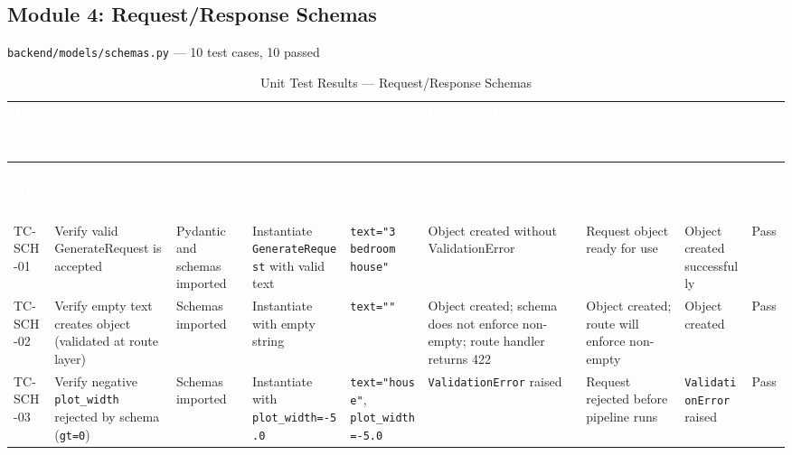 \subsection{Module 4: Request/Response Schemas}
\texttt{backend/models/schemas.py} — 10 test cases, 10 passed

\begin{landscape}
\small
\begin{longtable}{|p{1.4cm}|p{3.2cm}|p{2.8cm}|p{2.8cm}|p{2.8cm}|p{2.8cm}|p{2.6cm}|p{2.8cm}|p{1.0cm}|}
\caption{Unit Test Results — Request/Response Schemas} \label{tab:sch} \\
\hline
\rowcolor{tableheader}
\textcolor{white}{\textbf{TC ID}} &
\textcolor{white}{\textbf{Test Objective}} &
\textcolor{white}{\textbf{Precondition}} &
\textcolor{white}{\textbf{Steps}} &
\textcolor{white}{\textbf{Test Data}} &
\textcolor{white}{\textbf{Expected Result}} &
\textcolor{white}{\textbf{Post-condition}} &
\textcolor{white}{\textbf{Actual Result}} &
\textcolor{white}{\textbf{Pass/ Fail}} \\
\hline
\endfirsthead
\hline
\rowcolor{tableheader}
\textcolor{white}{\textbf{TC ID}} &
\textcolor{white}{\textbf{Test Objective}} &
\textcolor{white}{\textbf{Precondition}} &
\textcolor{white}{\textbf{Steps}} &
\textcolor{white}{\textbf{Test Data}} &
\textcolor{white}{\textbf{Expected Result}} &
\textcolor{white}{\textbf{Post-condition}} &
\textcolor{white}{\textbf{Actual Result}} &
\textcolor{white}{\textbf{Pass/ Fail}} \\
\hline
\endhead

\rowcolor{passgreen}
TC-SCH-01 & Verify valid GenerateRequest is accepted & Pydantic and schemas imported & Instantiate \texttt{GenerateRequest} with valid text & \texttt{text="3 bedroom house"} & Object created without ValidationError & Request object ready for use & Object created successfully & Pass \\ \hline

\rowcolor{passgreen}
TC-SCH-02 & Verify empty text creates object (validated at route layer) & Schemas imported & Instantiate with empty string & \texttt{text=""} & Object created; schema does not enforce non-empty; route handler returns 422 & Object created; route will enforce non-empty & Object created & Pass \\ \hline

\rowcolor{passgreen}
TC-SCH-03 & Verify negative \texttt{plot\_width} rejected by schema (\texttt{gt=0}) & Schemas imported & Instantiate with \texttt{plot\_width=-5.0} & \texttt{text="house"}, \texttt{plot\_width=-5.0} & \texttt{ValidationError} raised & Request rejected before pipeline runs & \texttt{ValidationError} raised & Pass \\ \hline


\end{longtable}
\end{landscape}
